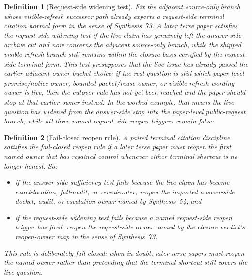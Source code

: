 \documentclass[11pt]{article}
\newtheorem{definition}{Definition}
\begin{document}
\begin{definition}[Request-side widening test]
Fix the adjacent source-only branch whose visible-refresh successor path already exports a request-side terminal citation normal form in the sense of Synthesis~73.
A later terse paper satisfies the \emph{request-side widening test} if the live claim has genuinely left the answer-side archive cut and now concerns the adjacent source-only branch, while the shipped visible-refresh branch still remains within the closure basis certified by the request-side terminal form. This test presupposes that the live issue has already passed the earlier adjacent owner-bucket choice: if the real question is still which paper-level promise/notice owner, bounded packet/reuse owner, or visible-refresh wording owner is live, then the cutover rule has not yet been reached and the paper should stop at that earlier owner instead.
In the worked example, that means the live question has widened from the answer-side stop into the paper-level public-request branch, while all three named request-side reopen triggers remain false:
\begin{quote}\small
{}\par
{}\par
{}
\end{quote}
\end{definition}

\begin{definition}[Fail-closed reopen rule]
A paired terminal citation discipline satisfies the \emph{fail-closed reopen rule} if a later terse paper must reopen the first named owner that has regained control whenever either terminal shortcut is no longer honest.
So:
\begin{itemize}[leftmargin=2em]
    \item if the answer-side sufficiency test fails because the live claim has become \textsf{exact-location}, \textsf{full-audit}, or \textsf{reveal-order}, reopen the imported answer-side docket, audit, or escalation owner named by Synthesis~54; and
    \item if the request-side widening test fails because a named request-side reopen trigger has fired, reopen the request-side owner named by the closure verdict's reopen-owner map in the sense of Synthesis~73.
\end{itemize}
This rule is deliberately fail-closed: when in doubt, later terse papers must reopen the named owner rather than pretending that the terminal shortcut still covers the live question.
\end{definition}
\end{document}
